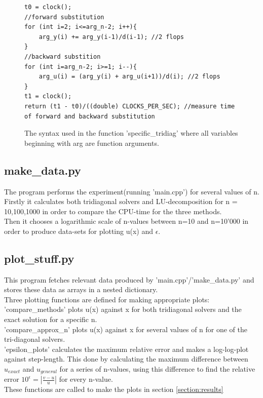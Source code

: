 \documentclass[11pt,a4paper,notitlepage]{article}
\begin{document}
\begin{figure}
\label{code:specific_syntax}
\lstset{style=c++style}
\begin{lstlisting}[frame=single]
t0 = clock();
//forward substitution
for (int i=2; i<=arg_n-2; i++){
	arg_y(i) += arg_y(i-1)/d(i-1); //2 flops
}
//backward substition
for (int i=arg_n-2; i>=1; i--){
    arg_u(i) = (arg_y(i) + arg_u(i+1))/d(i); //2 flops
}
t1 = clock();
return (t1 - t0)/((double) CLOCKS_PER_SEC); //measure time of forward and backward substitution
\end{lstlisting}
\caption{The syntax used in the function 'specific\_tridiag' where all variables beginning with arg are function arguments.}
\end{figure}

\subsection{make\_data.py}
	The program performs the experiment(running 'main.cpp') for several values of n. \\
	Firstly it calculates both tridiagonal solvers and LU-decomposition for n = 10,100,1000 in order to compare the CPU-time for the three methods. \\
	Then it chooses a logarithmic scale of n-values between n=10 and n=10'000 in order to produce data-sets for plotting u(x) and $\epsilon$.

\subsection{plot\_stuff.py}
	This program fetches relevant data produced by 'main.cpp'/'make\_data.py' and stores these data as arrays in a nested dictionary. \\
	Three plotting functions are defined for making appropriate plots: \\
	'compare\_methods' plots u(x) against x for both tridiagonal solvers and the exact solution for a specific n. \\
	'compare\_approx\_n' plots u(x) against x for several values of n for one of the tri-diagonal solvers. \\
	'epsilon\_plots' calculates the maximum relative error and makes a log-log-plot against step-length. This done by calculating the maximum difference between $u_{exact}$ and $u_{general}$ for a series of n-values, using this difference to find the relative error $10^\epsilon = \left|\frac{v-u}{u}\right|$ for every n-value. \\
	These functions are called to make the plots in section \ref{section:results}
\end{document}
